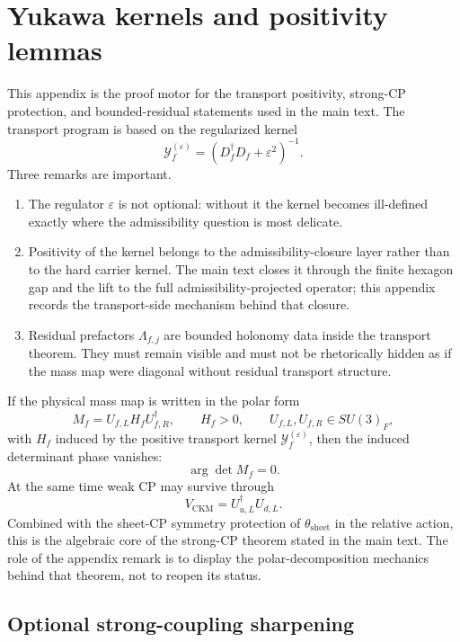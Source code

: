 \section{Yukawa kernels and positivity lemmas}
\label{app:yukawa}

This appendix is the proof motor for the transport positivity, strong-CP protection, and bounded-residual statements used in the main text. The transport program is based on the regularized kernel
\[
\mathcal Y_f^{(\varepsilon)}=(D_f^\dagger D_f+\varepsilon^2)^{-1}.
\]
Three remarks are important.
\begin{enumerate}[leftmargin=1.5em, topsep=3pt, itemsep=3pt]
    \item The regulator $\varepsilon$ is not optional: without it the kernel becomes ill-defined exactly where the admissibility question is most delicate.
    \item Positivity of the kernel belongs to the admissibility-closure layer rather than to the hard carrier kernel. The main text closes it through the finite hexagon gap and the lift to the full admissibility-projected operator; this appendix records the transport-side mechanism behind that closure.
    \item Residual prefactors $\Lambda_{f,j}$ are bounded holonomy data inside the transport theorem. They must remain visible and must not be rhetorically hidden as if the mass map were diagonal without residual transport structure.
\end{enumerate}

\begin{remark}
If the physical mass map is written in the polar form
\[
M_f=U_{f,L}H_fU_{f,R}^\dagger,
\qquad
H_f>0,
\qquad
U_{f,L},U_{f,R}\in SU(3)_F,
\]
with $H_f$ induced by the positive transport kernel $\mathcal Y_f^{(\varepsilon)}$, then the induced determinant phase vanishes:
\[
\arg\det M_f=0.
\]
At the same time weak CP may survive through
\[
V_{\mathrm{CKM}}=U_{u,L}^\dagger U_{d,L}.
\]
Combined with the sheet-CP symmetry protection of $\theta_{\mathrm{sheet}}$ in the relative action, this is the algebraic core of the strong-CP theorem stated in the main text. The role of the appendix remark is to display the polar-decomposition mechanics behind that theorem, not to reopen its status.
\end{remark}

\subsection{Optional strong-coupling sharpening}

